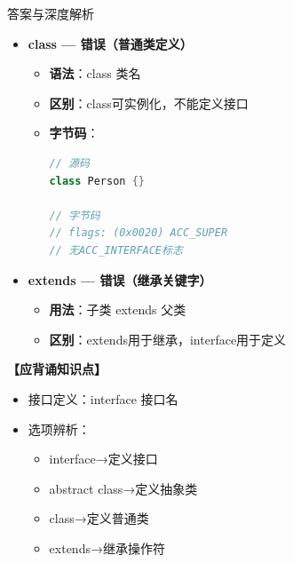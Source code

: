 \documentclass[12pt, a4paper]{ctexart}
\begin{document}
\begin{enumerate}[label=\textbf{\arabic*.}]
\begin{bluebox}{答案与深度解析}
\begin{itemize}[leftmargin=*, nosep, label={}]
\begin{itemize}[label={}, leftmargin=*, nosep]
\begin{lstlisting}[language=Java]
    Animal(String name) {  // 构造方法
        this.name = name;
    }

    void sleep() {  // 非抽象方法
        System.out.println("睡觉");
    }

    abstract void makeSound();  // 抽象方法
}
// abstract class是抽象类，不是接口
				      \end{lstlisting}
			            \end{itemize}

			      \item[C] \textbf{class — 错误（普通类定义）}
			            \begin{itemize}[label={}, nosep]
				            \item \textbf{语法}：class 类名
				            \item \textbf{区别}：class可实例化，不能定义接口
				            \item \textbf{字节码}：
				                  \begin{lstlisting}[language=Java]
// 源码
class Person {}

// 字节码
// flags: (0x0020) ACC_SUPER
// 无ACC_INTERFACE标志
				            \end{lstlisting}
			            \end{itemize}

			      \item[D] \textbf{extends — 错误（继承关键字）}
			            \begin{itemize}[label={}, nosep]
				            \item \textbf{用法}：子类 extends 父类
				            \item \textbf{区别}：extends用于继承，interface用于定义
			            \end{itemize}
		      \end{itemize}

		      \textbf{【应背诵知识点】}
		      \begin{itemize}[label={}, nosep]
			      \item 接口定义：interface 接口名
			      \item 选项辨析：
			            \begin{itemize}[label={}, nosep]
				            \item interface→定义接口
				            \item abstract class→定义抽象类
				            \item class→定义普通类
				            \item extends→继承操作符
			            \end{itemize}
		      \end{itemize}


\end{bluebox}
\end{enumerate}
\end{document}
